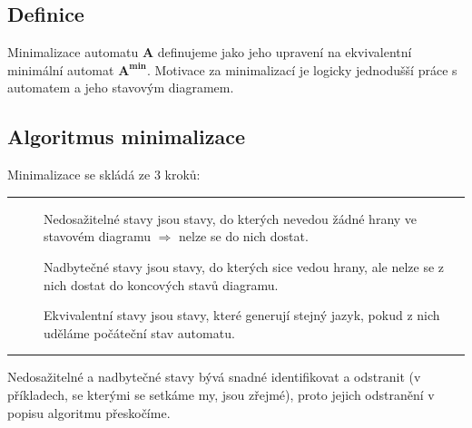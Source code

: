 \documentclass{report}
\begin{document}
\subsection*{Definice}
Minimalizace automatu \textbf{A} definujeme jako jeho upravení na ekvivalentní minimální automat $\mathbf{A^{min}}$. Motivace za minimalizací je logicky jednodušší práce s automatem a jeho stavovým diagramem.

\subsection*{Algoritmus minimalizace}
Minimalizace se skládá ze 3 kroků:
\vspace{0.4cm}    
\hrule
\vspace{0.1cm}
\begin{description}
    \item[] Nedosažitelné stavy jsou stavy, do kterých nevedou žádné hrany ve stavovém diagramu $\Rightarrow$ nelze se do nich dostat.
    \item[] Nadbytečné stavy jsou stavy, do kterých sice vedou hrany, ale nelze se z nich dostat do koncových stavů diagramu.
    \item[] Ekvivalentní stavy jsou stavy, které generují stejný jazyk, pokud z nich uděláme počáteční stav automatu.
\end{description}
\vspace{0.1cm}    
\hrule
\vspace{0.4cm} 
Nedosažitelné a nadbytečné stavy bývá snadné identifikovat a odstranit (v příkladech, se kterými se setkáme my, jsou zřejmé), proto jejich odstranění v popisu algoritmu přeskočíme.
\end{document}
